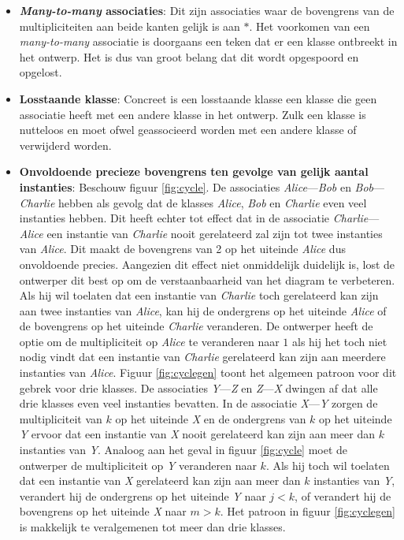 \begin{itemize}
	\item \textbf{\textit{Many-to-many} associaties}: Dit zijn associaties waar de bovengrens van de multipliciteiten aan beide kanten gelijk is aan $*$. Het voorkomen van een \textit{many-to-many} associatie is doorgaans een teken dat er een klasse ontbreekt in het ontwerp. Het is dus van groot belang dat dit wordt opgespoord en opgelost.
	
	\item \textbf{Losstaande klasse}: Concreet is een losstaande klasse een klasse die geen associatie heeft met een andere klasse in het ontwerp. Zulk een klasse is nutteloos en moet ofwel geassocieerd worden met een andere klasse of verwijderd worden.
	
	\item \textbf{Onvoldoende precieze bovengrens ten gevolge van gelijk aantal instanties}\cite{Balaban2015}: Beschouw figuur \ref{fig:cycle}. De associaties \textit{Alice}---\textit{Bob} en \textit{Bob}---\textit{Charlie} hebben als gevolg dat de klasses \textit{Alice}, \textit{Bob} en \textit{Charlie} even veel instanties hebben. Dit heeft echter tot effect dat in de associatie \textit{Charlie}---\textit{Alice} een instantie van \textit{Charlie} nooit gerelateerd zal zijn tot twee instanties van \textit{Alice}. Dit maakt de bovengrens van 2 op het uiteinde \textit{Alice} dus onvoldoende precies. Aangezien dit effect niet onmiddelijk duidelijk is, lost de ontwerper dit best op om de verstaanbaarheid van het diagram te verbeteren. Als hij wil toelaten dat een instantie van \textit{Charlie} toch gerelateerd kan zijn aan twee instanties van \textit{Alice}, kan hij de ondergrens op het uiteinde \textit{Alice} of de bovengrens op het uiteinde \textit{Charlie} veranderen. De ontwerper heeft de optie om de multipliciteit op \textit{Alice} te veranderen naar $1$ als hij het toch niet nodig vindt dat een instantie van \textit{Charlie} gerelateerd kan zijn aan meerdere instanties van \textit{Alice}. Figuur \ref{fig:cyclegen} toont het algemeen patroon voor dit gebrek voor drie klasses. De associaties \textit{Y}---\textit{Z} en \textit{Z}---\textit{X} dwingen af dat alle drie klasses even veel instanties bevatten. In de associatie \textit{X}---\textit{Y} zorgen de multipliciteit van $k$ op het uiteinde \textit{X} en de ondergrens van $k$ op het uiteinde \textit{Y} ervoor dat een instantie van \textit{X} nooit gerelateerd kan zijn aan meer dan $k$ instanties van \textit{Y}. Analoog aan het geval in figuur \ref{fig:cycle} moet de ontwerper de multipliciteit op \textit{Y} veranderen naar $k$. Als hij toch wil toelaten dat een instantie van \textit{X} gerelateerd kan zijn aan meer dan $k$ instanties van \textit{Y}, verandert hij de ondergrens op het uiteinde \textit{Y} naar $j < k$, of verandert hij de bovengrens op het uiteinde \textit{X} naar $m > k$. Het patroon in figuur \ref{fig:cyclegen} is makkelijk te veralgemenen tot meer dan drie klasses.
\end{itemize}

